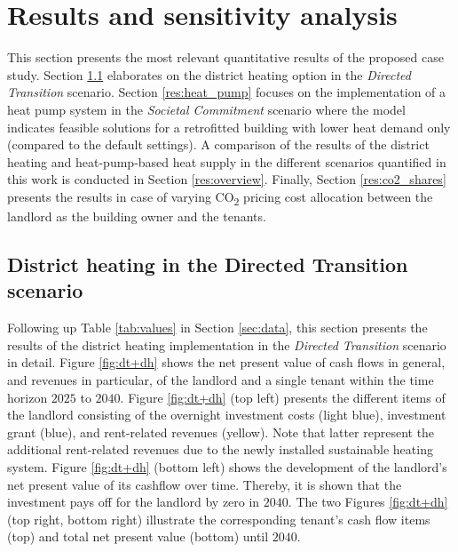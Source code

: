 \section{Results and sensitivity analysis}\label{results}
This section presents the most relevant quantitative results of the proposed case study. Section \ref{res:district_heating} elaborates on the district heating option in the \textit{Directed Transition} scenario. Section \ref{res:heat_pump} focuses on the implementation of a heat pump system in the \textit{Societal Commitment} scenario where the model indicates feasible solutions for a retrofitted building with lower heat demand only (compared to the default settings). A comparison of the results of the district heating and heat-pump-based heat supply in the different scenarios quantified in this work is conducted in Section \ref{res:overview}. Finally, Section \ref{res:co2_shares} presents the results in case of varying CO\textsubscript{2} pricing cost allocation between the landlord as the building owner and the tenants. 

\subsection{District heating in the Directed Transition scenario}\label{res:district_heating}
Following up Table \ref{tab:values} in Section \ref{sec:data}, this section presents the results of the district heating implementation in the \textit{Directed Transition} scenario in detail. Figure \ref{fig:dt+dh} shows the net present value of cash flows in general, and revenues in particular, of the landlord and a single tenant within the time horizon $2025$ to $2040$. Figure \ref{fig:dt+dh} (top left) presents the different items of the landlord consisting of the overnight investment costs (light blue), investment grant (blue), and rent-related revenues (yellow). Note that latter represent the additional rent-related revenues due to the newly installed sustainable heating system. Figure \ref{fig:dt+dh} (bottom left) shows the development of the landlord's net present value of its cashflow over time. Thereby, it is shown that the investment pays off for the landlord by zero in $2040$. The two Figures \ref{fig:dt+dh} (top right, bottom right) illustrate the corresponding tenant's cash flow items (top) and total net present value (bottom) until $2040$. 

